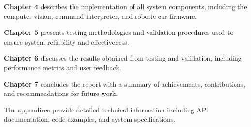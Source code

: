 \textbf{Chapter 4} describes the implementation of all system components, including the computer vision, command interpreter, and robotic car firmware.

\textbf{Chapter 5} presents testing methodologies and validation procedures used to ensure system reliability and effectiveness.

\textbf{Chapter 6} discusses the results obtained from testing and validation, including performance metrics and user feedback.

\textbf{Chapter 7} concludes the report with a summary of achievements, contributions, and recommendations for future work.

The appendices provide detailed technical information including API documentation, code examples, and system specifications.